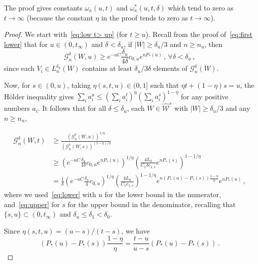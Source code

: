 \documentclass[10pt]{amsart}
\theoremstyle{definition}\newtheorem{defi}[theo]{Definition}\newtheorem{rema}[theo]{Remark}\newtheorem{exam}[theo]{Example}\newtheorem{exem}[theo]{Example}\newtheorem{nota}[theo]{Notation}
\newcommand{\cG}{\mathcal{G}}
\newcommand{\cW}{\mathcal{W}}
\newcommand{\hW}{\widehat{\cW}}
\let\oldforall\forall
\renewcommand*{\forall}{\mathrel{\oldforall}}
\begin{document}
The proof gives constants $\omega_\kappa(u,t)$ and $\omega_\kappa^*(u,t,\delta)$ which tend to zero as $t\to \infty$ (because the constant $\eta$ in the proof tends to zero as $t\to \infty$).

\begin{proof}
We start with~\eqref{eq:low t> up} (for $t \ge u$). Recall from the proof of~\eqref{eq:first lower} that for $u \in (0, t_\infty)$ and $\delta < \delta_u$, if $|W| \ge \delta_u/3$ and $n\ge n_u$, then
\begin{equation}\label{eq:lower}
\cG_n^\delta(W,u) \ge e^{-u C} \frac{\delta_u}{4 \delta} c_{0,u} e^{n P_*(u)} \,,\, \forall \delta < \delta_u \,,
\end{equation}
since each $V_i \in L_n^{\delta_u}(W)$ contains at least ${\delta_u}/{3\delta}$ elements of $\cG_n^\delta(W)$.


Now, for $s \in (0,u)$, taking $\eta(s,t,u)\in (0,1]$ such that $\eta t + (1-\eta)s = u$, the H\"older inequality gives $\sum_i a_i^{u}\le (\sum_i a_i^t )^\eta (\sum_i a_i^{s} )^{1-\eta} $ for any positive numbers $a_i$. It follows that for all $\delta {\le \delta_{u} }$, each $W \in \hW^s$ with $|W| \ge \delta_{u}/3$ and any $n \ge n_{u}$,

\begin{equation}
\begin{split}
\cG_n^\delta(W,t) &\ge \frac{(
\cG_n^\delta(W,u))^{1/\eta}} {(\cG_n^\delta(W,s))^{(1-\eta)/\eta}}\\
&\ge \left(e^{-u C} \frac{ \delta_{u}}{4 \delta} c_{0,u} e^{n P_*(u)} \right)^{1/\eta}
\left({ \frac{ 4L_0 }{C_1 \delta c_{1,s}} } e^{n P_*(s)} \right)^{1 - 1/\eta} \\
& = \frac{1}{\delta}
\left(e^{-u C} \frac{\delta_{u}}{4} c_{0,u} \right)^{1/\eta}
\left ({ \frac{4 L_0 }{ C_1 c_{1,s}} } \right)^{1-1/\eta} e^{n \left(P_*(u) - P_*(s)\right)\frac{1-\eta}{\eta} } e^{n P_*(u)} \,,
\end{split}
\end{equation}
where we used~\eqref{eq:lower} with $u$ for the lower bound in the numerator, and~\eqref{eq:upper} for $s$ for the upper bound in the denominator, recalling that $\{s,u\} \subset (0, t_\infty)$ and $\delta_{u} \le \delta_1 < \delta_0$.

Since $\eta (s,t,u)= ({u-s})/({t-s})$, we have
\begin{equation*}
\left(P_*(u) - P_*(s)\right)\frac {1-\eta}{\eta}=\frac {t-u}{u-s} \left(P_*(u)-P_*(s)\right) \,.
\end{equation*}



\end{proof}
\end{document}
